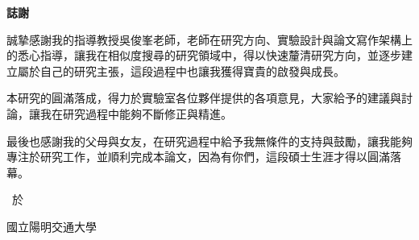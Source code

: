\thispagestyle{empty}

\begin{center}
\Large
\textbf{誌\hspace{1cm}謝}
\end{center}

\vspace{1cm}
\linespread{1.6}%
\selectfont
\hspace{0.25cm}

誠摯感謝我的指導教授吳俊峯老師，老師在研究方向、實驗設計與論文寫作架構上的悉心指導，讓我在相似度搜尋的研究領域中，得以快速釐清研究方向，並逐步建立屬於自己的研究主張，這段過程中也讓我獲得寶貴的啟發與成長。

本研究的圓滿落成，得力於實驗室各位夥伴提供的各項意見，大家給予的建議與討論，讓我在研究過程中能夠不斷修正與精進。

最後也感謝我的父母與女友，在研究過程中給予我無條件的支持與鼓勵，讓我能夠專注於研究工作，並順利完成本論文，因為有你們，這段碩士生涯才得以圓滿落幕。

\vspace{2.5cm}
\begin{flushright}
\studentCnName\ 於

國立陽明交通大學\ \NameofDepartmentInstituteCN

\ThesisDateTW
\end{flushright}
